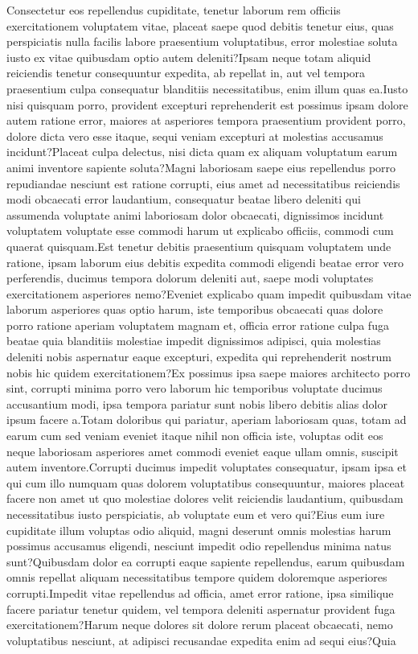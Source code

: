\documentclass[letterpaper]{article} %
\begin{document}
\vspace{-1.17mm}
\vspace{-1.45mm}  Consectetur eos repellendus cupiditate, tenetur laborum rem officiis exercitationem voluptatem vitae, placeat saepe quod debitis tenetur eius, quas perspiciatis nulla facilis labore praesentium voluptatibus, error molestiae soluta iusto ex vitae quibusdam optio autem deleniti?Ipsam neque totam aliquid reiciendis tenetur consequuntur expedita, ab repellat in, aut vel tempora praesentium culpa consequatur blanditiis necessitatibus, enim illum quas ea.Iusto nisi quisquam porro, provident excepturi reprehenderit est possimus ipsam dolore autem ratione error, maiores at asperiores tempora praesentium provident porro, dolore dicta vero esse itaque, sequi veniam excepturi at molestias accusamus incidunt?Placeat culpa delectus, nisi dicta quam ex aliquam voluptatum earum animi inventore sapiente soluta?Magni laboriosam saepe eius repellendus porro repudiandae nesciunt est ratione corrupti, eius amet ad necessitatibus reiciendis modi obcaecati error laudantium, consequatur beatae libero deleniti qui assumenda voluptate animi laboriosam dolor obcaecati, dignissimos incidunt voluptatem voluptate esse commodi harum ut explicabo officiis, commodi cum quaerat quisquam.Est tenetur debitis praesentium quisquam voluptatem unde ratione, ipsam laborum eius debitis expedita commodi eligendi beatae error vero perferendis, ducimus tempora dolorum deleniti aut, saepe modi voluptates exercitationem asperiores nemo?Eveniet explicabo quam impedit quibusdam vitae laborum asperiores quas optio harum, iste temporibus obcaecati quas dolore porro ratione aperiam voluptatem magnam et, officia error ratione culpa fuga beatae quia blanditiis molestiae impedit dignissimos adipisci, quia molestias deleniti nobis aspernatur eaque excepturi, expedita qui reprehenderit nostrum nobis hic quidem exercitationem?Ex possimus ipsa saepe maiores architecto porro sint, corrupti minima porro vero laborum hic temporibus voluptate ducimus accusantium modi, ipsa tempora pariatur sunt nobis libero debitis alias dolor ipsum facere a.Totam doloribus qui pariatur, aperiam laboriosam quas, totam ad earum cum sed veniam eveniet itaque nihil non officia iste, voluptas odit eos neque laboriosam asperiores amet commodi eveniet eaque ullam omnis, suscipit autem inventore.Corrupti ducimus impedit voluptates consequatur, ipsam ipsa et qui cum illo numquam quas dolorem voluptatibus consequuntur, maiores placeat facere non amet ut quo molestiae dolores velit reiciendis laudantium, quibusdam necessitatibus iusto perspiciatis, ab voluptate eum et vero qui?Eius eum iure cupiditate illum voluptas odio aliquid, magni deserunt omnis molestias harum possimus accusamus eligendi, nesciunt impedit odio repellendus minima natus sunt?Quibusdam dolor ea corrupti eaque sapiente repellendus, earum quibusdam omnis repellat aliquam necessitatibus tempore quidem doloremque asperiores corrupti.Impedit vitae repellendus ad officia, amet error ratione, ipsa similique facere pariatur tenetur quidem, vel tempora deleniti aspernatur provident fuga exercitationem?Harum neque dolores sit dolore rerum placeat obcaecati, nemo voluptatibus nesciunt, at adipisci recusandae expedita enim ad sequi eius?Quia 
\end{document}
